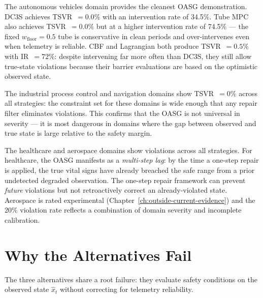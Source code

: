 
The autonomous vehicles domain provides the cleanest OASG demonstration.
DC3S achieves TSVR~$= 0.0\%$ with an intervention rate of 34.5\%.
Tube MPC also achieves TSVR~$= 0.0\%$ but at a higher intervention rate of
74.5\% --- the fixed $w_{\text{floor}} = 0.5$ tube is conservative in clean
periods and over-intervenes even when telemetry is reliable.
CBF and Lagrangian both produce TSVR~$= 0.5\%$ with IR~$= 72\%$: despite
intervening far more often than DC3S, they still allow true-state violations
because their barrier evaluations are based on the optimistic observed
state.

The industrial process control and navigation domains show TSVR~$= 0\%$
across all strategies: the constraint set for these domains is wide enough
that any repair filter eliminates violations.  This confirms that the OASG
is not universal in severity --- it is most dangerous in domains where the
gap between observed and true state is large relative to the safety margin.

The healthcare and aerospace domains show violations across all strategies.
For healthcare, the OASG manifests as a \emph{multi-step lag}: by the time
a one-step repair is applied, the true vital signs have already breached the
safe range from a prior undetected degraded observation.  The one-step
repair framework can prevent \emph{future} violations but not retroactively
correct an already-violated state.  Aerospace is rated experimental
(Chapter~\ref{ch:outside-current-evidence}) and the 20\% violation rate reflects a
combination of domain severity and incomplete calibration.

\section{Why the Alternatives Fail}

The three alternatives share a root failure: they evaluate safety conditions
on the observed state $\hat{x}_t$ without correcting for telemetry
reliability.

